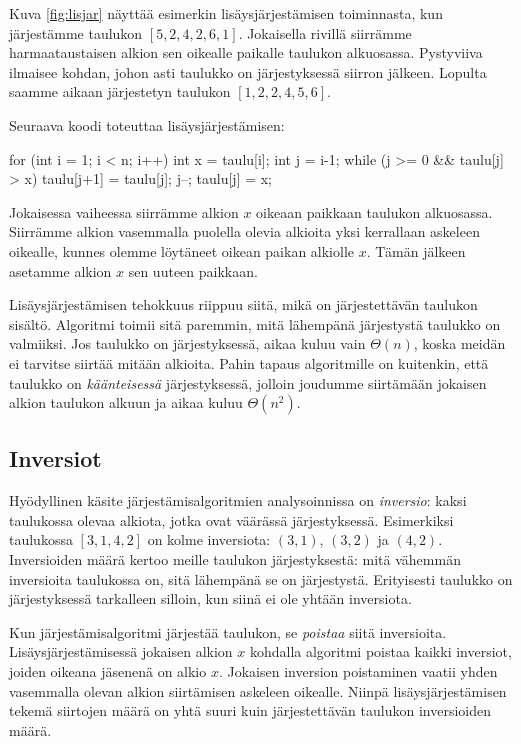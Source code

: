 Kuva \ref{fig:lisjar} näyttää esimerkin lisäysjärjestämisen
toiminnasta, kun järjes\-tämme taulukon $[5,2,4,2,6,1]$.
Jokaisella rivillä siirrämme harmaataustaisen alkion
sen oikealle paikalle taulukon alkuosassa.
Pystyviiva ilmaisee kohdan, johon asti taulukko on järjestyksessä
siirron jälkeen.
Lopulta saamme aikaan järjestetyn taulukon $[1,2,2,4,5,6]$.

Seuraava koodi toteuttaa lisäysjärjestämisen:

\begin{code}
for (int i = 1; i < n; i++) {
    int x = taulu[i];
    int j = i-1;
    while (j >= 0 && taulu[j] > x) {
        taulu[j+1] = taulu[j];
        j--;
    }
    taulu[j] = x;
}
\end{code}

Jokaisessa vaiheessa siirrämme alkion $x$
oikeaan paikkaan taulukon alku\-osassa.
Siirrämme alkion vasemmalla puolella olevia alkioita
yksi kerrallaan askeleen oikealle, kunnes olemme löytäneet
oikean paikan alkiolle $x$. Tämän jälkeen asetamme
alkion $x$ sen uuteen paikkaan.

Lisäysjärjestämisen tehokkuus riippuu siitä,
mikä on järjestettävän taulukon sisältö.
Algoritmi toimii sitä paremmin, mitä lähempänä järjestystä
taulukko on valmiiksi.
Jos taulukko on järjestyksessä,
aikaa kuluu vain $\Theta(n)$, koska meidän ei tarvitse siirtää
mitään alkioita.
Pahin tapaus algoritmille on kuitenkin, että taulukko on
\emph{käänteisessä} järjestyksessä,
jolloin joudumme siirtämään jokaisen alkion
taulukon alkuun ja aikaa kuluu $\Theta(n^2)$.

\subsection{Inversiot}

Hyödyllinen käsite järjestämisalgoritmien analysoinnissa
on \emph{inversio}: kaksi taulukossa olevaa alkiota,
jotka ovat väärässä järjestyksessä.
Esimerkiksi taulukossa $[3,1,4,2]$ on kolme inversiota:
$(3,1)$, $(3,2)$ ja $(4,2)$.
Inversioiden määrä kertoo meille taulukon järjestyksestä:
mitä vähemmän inversioita taulukossa on,
sitä lähempänä se on järjestystä.
Erityisesti taulukko on järjestyksessä tarkalleen silloin,
kun siinä ei ole yhtään inversiota.

Kun järjestämisalgoritmi järjestää taulukon,
se \emph{poistaa} siitä inversioita.
Lisäysjärjestämisessä jokaisen alkion $x$ kohdalla
algoritmi poistaa kaikki inversiot,
joiden oikeana jäsenenä on alkio $x$.
Jokaisen inversion poistaminen vaatii yhden
vasemmalla olevan alkion siirtämisen askeleen oikealle.
Niinpä lisäysjärjestämisen tekemä siirtojen määrä on yhtä suuri
kuin järjestettävän taulukon inversioiden määrä.

